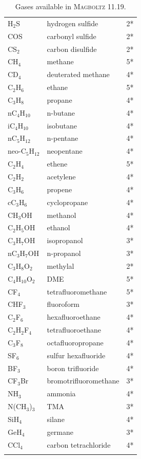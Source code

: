 \begin{appendix}
\begin{longtable}{l l l}
  H\(_{2}\)S & hydrogen sulfide & 2* \\
  COS        & carbonyl sulfide & 2* \\
  CS\(_{2}\) & carbon disulfide & 2* \\
  \midrule
  CH\(_{4}\)           & methane   & 5* \\
  CD\(_{4}\)           & deuterated methane & 4* \\
  C\(_{2}\)H\(_{6}\)   & ethane    & 5* \\
  C\(_{3}\)H\(_{8}\)   & propane   & 4* \\
  nC\(_{4}\)H\(_{10}\) & n-butane  & 4* \\
  iC\(_{4}\)H\(_{10}\) & isobutane & 4* \\ 
  nC\(_{5}\)H\(_{12}\) & n-pentane & 4* \\  
  neo-C\(_{5}\)H\(_{12}\) & neopentane & 4* \\
  C\(_{2}\)H\(_{4}\)   & ethene    & 5* \\
  C\(_{2}\)H\(_{2}\)   & acetylene & 4* \\
  C\(_{3}\)H\(_{6}\)   & propene   & 4* \\
  cC\(_{3}\)H\(_{6}\)   & cyclopropane & 4* \\
  \midrule
  CH\(_{3}\)OH         & methanol        & 4* \\
  C\(_{2}\)H\(_{5}\)OH & ethanol         & 4* \\
  C\(_{3}\)H\(_{7}\)OH & isopropanol     & 3* \\
  nC\(_{3}\)H\(_{7}\)OH & n-propanol     & 3* \\
  C\(_{3}\)H\(_{8}\)O\(_{2}\)  & methylal & 2* \\
  C\(_{4}\)H\(_{10}\)O\(_{2}\) & DME      & 5* \\
  \midrule
  CF\(_{4}\)           & tetrafluoromethane & 5* \\
  CHF\(_{3}\)          & fluoroform         & 3* \\
  C\(_{2}\)F\(_{6}\)   & hexafluoroethane   & 4* \\
  C\(_{2}\)H\(_{2}\)F\(_{4}\) & tetrafluoroethane & 4* \\
  C\(_{3}\)F\(_{8}\)   & octafluoropropane  & 4* \\
  SF\(_{6}\)           & sulfur hexafluoride  & 4* \\
  BF\(_{3}\)           & boron trifluoride    & 4* \\ 
  CF\(_{3}\)Br         & bromotrifluoromethane & 3* \\
  \midrule
  NH\(_{3}\)            & ammonia  & 4* \\
  N(CH\(_{3}\))\(_{3}\) & TMA      & 3* \\
  SiH\(_{4}\)           & silane   & 4* \\
  GeH\(_{4}\)           & germane  & 3* \\
  CCl\(_{4}\)           & carbon tetrachloride & 4* \\ 
  \bottomrule
  \caption{Gases available in \textsc{Magboltz} 11.19.} 
  \label{Tab:GasesMagboltz11}
\end{longtable}


\end{appendix}

